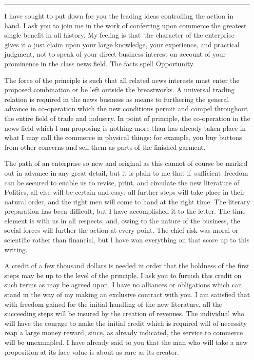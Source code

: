 \documentclass[twoside,symmetric,nobib,justified]{tufte-book}
\begin{document}
\begin{center}
\vspace{0.2in}
\noindent\rule{2in}{0.5pt} 
\vspace{0.2in}
\end{center}


I have sought to put down for you the leading
ideas controlling the action in hand. I ask you to join me in the work
of conferring upon commerce the greatest single benefit in all history.
My feeling is that~the character of the enterprise gives it a just claim
upon your large knowledge, your experience, and practical judgment, not
to speak of your direct business interest on account of your prominence
in the class news field. The facts spell Opportunity.~

The force of the principle is such that all related news interests must
enter the proposed combination or be left outside the breastworks. A
universal trading relation is required in the news business as means to
furthering the general advance in co-operation which the new conditions
permit and compel throughout the entire field of trade and industry. In
point of principle, the co-operation in the news field which I am
proposing is nothing more than has already taken place in what I may
call the commerce in physical things; for example, you buy buttons from
other concerns and sell them as parts of the finished garment.~

The path of an enterprise so new and original as this cannot of course
be marked out in advance in any great detail, but it is plain to me that
if~sufficient~freedom can be secured to enable us to revise, print, and
circulate the new literature of Politics, all else will be certain and
easy; all further steps will take place in their natural order, and the
right men will come to hand at the right time. The literary preparation
has been difficult, but I have accomplished it to the letter. The time
element is with us in all respects, and, owing to the nature of the
business, the social forces will further the action at every point. The
chief risk was moral or scientific rather than financial, but I have won
everything on that score up to this writing.~

A credit of a few thousand dollars is needed in order that the boldness
of the first steps may be up to the level of the principle. I ask you to
furnish this credit on such terms as may be agreed upon. I have no
alliances or obligations which can stand in the way of my making an
exclusive contract with you. I am satisfied that with freedom gained for
the initial handling of the new literature, all the succeeding steps
will be insured by the creation of revenues. The individual who will
have the courage to make the initial credit which is required will of
necessity reap a large money reward, since, as already indicated, the
service to commerce will be unexampled. I have already said to you that
the man who will take a new proposition at its face value is about as
rare as its creator.~
\end{document}
